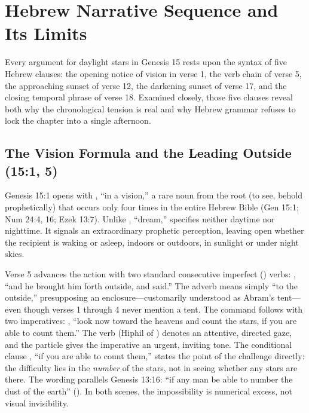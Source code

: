 \section{Hebrew Narrative Sequence and Its Limits}

Every argument for daylight stars in Genesis 15 rests upon the syntax of five Hebrew clauses: the opening notice of vision in verse 1, the verb chain of verse 5, the approaching sunset of verse 12, the darkening sunset of verse 17, and the closing temporal phrase of verse 18. Examined closely, those five clauses reveal both why the chronological tension is real and why Hebrew grammar refuses to lock the chapter into a single afternoon.

\subsection{The Vision Formula and the Leading Outside (15:1, 5)}

Genesis 15:1 opens with , ``in a vision,'' a rare noun from the root  (to see, behold prophetically) that occurs only four times in the entire Hebrew Bible (Gen 15:1; Num 24:4, 16; Ezek 13:7). Unlike , ``dream,''  specifies neither daytime nor nighttime. It signals an extraordinary prophetic perception, leaving open whether the recipient is waking or asleep, indoors or outdoors, in sunlight or under night skies.

Verse 5 advances the action with two standard consecutive imperfect () verbs: , ``and he brought him forth outside, and said.'' The adverb  means simply ``to the outside,'' presupposing an enclosure---customarily understood as Abram's tent---even though verses 1 through 4 never mention a tent. The command follows with two imperatives: , ``look now toward the heavens and count the stars, if you are able to count them.'' The verb  (Hiphil of ) denotes an attentive, directed gaze, and the particle  gives the imperative an urgent, inviting tone. The conditional clause , ``if you are able to count them,'' states the point of the challenge directly: the difficulty lies in the \emph{number} of the stars, not in seeing whether any stars are there. The wording parallels Genesis 13:16: ``if any man be able to number the dust of the earth'' (). In both scenes, the impossibility is numerical excess, not visual invisibility.


